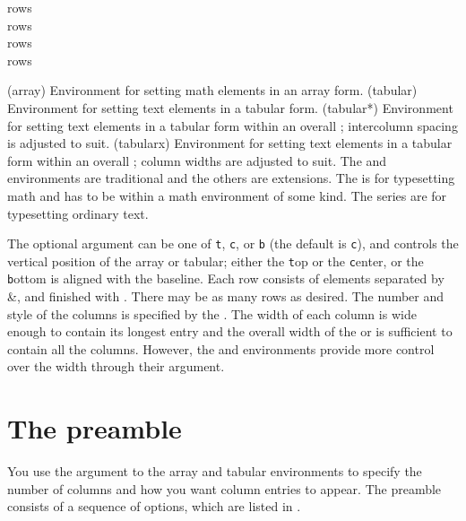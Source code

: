 \begin{syntax}
\cmd{\[}  rows  \cmd{\]} \\
 rows  \\
 rows  \\
 rows  \\
\end{syntax}
\glossary(array)%
  {}%
  {Environment for setting math elements in an array form.}
\glossary(tabular)%
  {}%
  {Environment for setting text elements in a tabular form.}
\glossary(tabular*)%
  {}%
  {Environment for setting text elements in a tabular form within an overall 
  ; intercolumn spacing is adjusted to suit.}
\glossary(tabularx)%
  {}%
  {Environment for setting text elements in a tabular form within an overall
   ; column widths are adjusted to suit.}
The  and  environments are traditional and the others
are extensions. The  is for typesetting
math and has to be within a math environment of some kind. The 
series are for typesetting ordinary text.

    The optional  argument can be one of \texttt{t}, \texttt{c},
or \texttt{b} (the default is \texttt{c}), and controls the vertical position
of the array or tabular; either the \texttt{t}op or the \texttt{c}enter,
or the \texttt{b}ottom is aligned with the baseline. 
Each row consists of elements separated by
\&, and finished with \cmd{\\}. There may be as many rows as desired.
The number and style of the columns is specified by the .
The width of each column is wide enough to contain its longest entry and
the overall width of the  or  is sufficient to contain
all the columns. However, the  and  environments
provide more control over the width through their  argument.

\section{The preamble}

    You use the  argument to the array and tabular 
environments to specify the number of columns and how you want column
entries to appear. The preamble consists of a sequence of options, which
are listed in .

